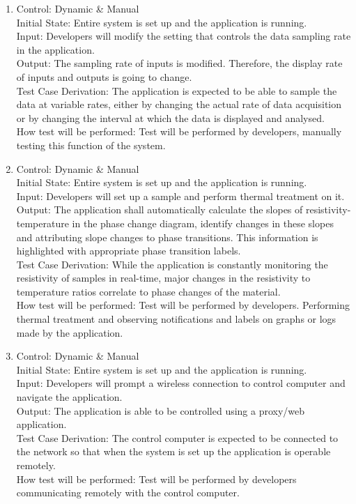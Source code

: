 \documentclass[12pt, titlepage]{article}
\begin{document}
\begin{enumerate}[{FR-T}1.]
    \item Control: Dynamic \& Manual\\
    Initial State: Entire system is set up and the application is running.\\
    Input: Developers will modify the setting that controls the data sampling rate in the application.\\
    Output: The sampling rate of inputs is modified. Therefore, the display rate of inputs and outputs is going to change.\\
    Test Case Derivation: The application is expected to be able to sample the data at variable rates, either by changing the actual rate of data acquisition or by changing the interval at which the data is displayed and analysed.\\
    How test will be performed: Test will be performed by developers, manually testing this function of the system. 
    
    \item Control: Dynamic \& Manual\\
    Initial State: Entire system is set up and the application is running.\\
    Input: Developers will set up a sample and perform thermal treatment on it.\\
    Output: The application shall automatically calculate the slopes of resistivity-temperature in the phase change diagram, identify changes in these slopes and attributing slope changes to phase transitions. This information is highlighted with appropriate phase transition labels.\\
    Test Case Derivation: While the application is constantly monitoring the resistivity of samples in real-time, major changes in the resistivity to temperature ratios correlate to phase changes of the material.\\
    How test will be performed: Test will be performed by developers. Performing thermal treatment and observing notifications and labels on graphs or logs made by the application.
    
    \item Control: Dynamic \& Manual\\
    Initial State: Entire system is set up and the application is running.\\
    Input: Developers will prompt a wireless connection to control computer and navigate the application.\\
    Output: The application is able to be controlled using a proxy/web application.\\
    Test Case Derivation: The control computer is expected to be connected to the network so that when the system is set up the application is operable remotely.\\
    How test will be performed: Test will be performed by developers communicating remotely with the control computer.  
\end{enumerate}
\end{document}
